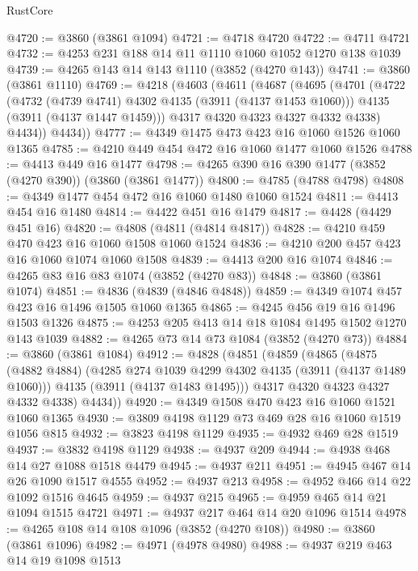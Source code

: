 \begin{lexlean}{RustCore}
\begin{coremodule}
@4720 := @3860 (@3861 @1094)
@4721 := @4718 @4720
@4722 := @4711 @4721
@4732 := @4253 @231 @188 @14 @11 @1110 @1060 @1052 @1270 @138 @1039
@4739 := @4265 @143 @14 @143 @1110 (@3852 (@4270 @143))
@4741 := @3860 (@3861 @1110)
@4769 := @4218
    (@4603
      (@4611
        (@4687
          (@4695
            (@4701
              (@4722
                (@4732 (@4739 @4741) @4302 @4135 (@3911 (@4137 @1453 @1060)))
                @4135
                (@3911 (@4137 @1447 @1459)))
              @4317
              @4320
              @4323
              @4327
              @4332
              @4338)
            @4434))
        @4434))
@4777 := @4349 @1475 @473 @423 @16 @1060 @1526 @1060 @1365
@4785 := @4210 @449 @454 @472 @16 @1060 @1477 @1060 @1526
@4788 := @4413 @449 @16 @1477
@4798 := @4265 @390 @16 @390 @1477 (@3852 (@4270 @390)) (@3860 (@3861 @1477))
@4800 := @4785 (@4788 @4798)
@4808 := @4349 @1477 @454 @472 @16 @1060 @1480 @1060 @1524
@4811 := @4413 @454 @16 @1480
@4814 := @4422 @451 @16 @1479
@4817 := @4428 (@4429 @451 @16)
@4820 := @4808 (@4811 (@4814 @4817))
@4828 := @4210 @459 @470 @423 @16 @1060 @1508 @1060 @1524
@4836 := @4210 @200 @457 @423 @16 @1060 @1074 @1060 @1508
@4839 := @4413 @200 @16 @1074
@4846 := @4265 @83 @16 @83 @1074 (@3852 (@4270 @83))
@4848 := @3860 (@3861 @1074)
@4851 := @4836 (@4839 (@4846 @4848))
@4859 := @4349 @1074 @457 @423 @16 @1496 @1505 @1060 @1365
@4865 := @4245 @456 @19 @16 @1496 @1503 @1326
@4875 := @4253 @205 @413 @14 @18 @1084 @1495 @1502 @1270 @143 @1039
@4882 := @4265 @73 @14 @73 @1084 (@3852 (@4270 @73))
@4884 := @3860 (@3861 @1084)
@4912 := @4828
    (@4851
      (@4859
        (@4865
          (@4875
            (@4882 @4884)
            (@4285 @274 @1039 @4299 @4302 @4135 (@3911 (@4137 @1489 @1060)))
            @4135
            (@3911 (@4137 @1483 @1495)))
          @4317
          @4320
          @4323
          @4327
          @4332
          @4338)
        @4434))
@4920 := @4349 @1508 @470 @423 @16 @1060 @1521 @1060 @1365
@4930 := @3809 @4198 @1129 @73 @469 @28 @16 @1060 @1519 @1056 @815
@4932 := @3823 @4198 @1129
@4935 := @4932 @469 @28 @1519
@4937 := @3832 @4198 @1129
@4938 := @4937 @209
@4944 := @4938 @468 @14 @27 @1088 @1518 @4479
@4945 := @4937 @211
@4951 := @4945 @467 @14 @26 @1090 @1517 @4555
@4952 := @4937 @213
@4958 := @4952 @466 @14 @22 @1092 @1516 @4645
@4959 := @4937 @215
@4965 := @4959 @465 @14 @21 @1094 @1515 @4721
@4971 := @4937 @217 @464 @14 @20 @1096 @1514
@4978 := @4265 @108 @14 @108 @1096 (@3852 (@4270 @108))
@4980 := @3860 (@3861 @1096)
@4982 := @4971 (@4978 @4980)
@4988 := @4937 @219 @463 @14 @19 @1098 @1513

\end{coremodule}
\end{lexlean}
